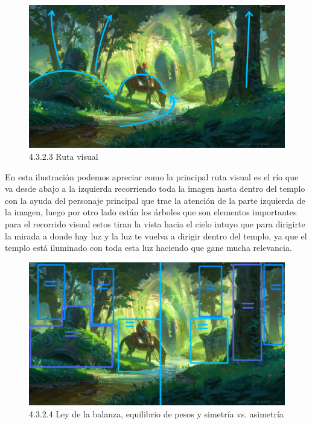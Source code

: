 \documentclass[12pt]{article}
\begin{document}
    \begin{figure}[H]
      \centering
      \includegraphics[width=\textwidth]{images/Saúl/Sección 3/EA_img3_2Composicion_3RutaVisual.png}
      \caption{\small 4.3.2.3 Ruta visual}
    \end{figure}

 En esta ilustración podemos apreciar como la principal ruta visual es el río que va desde abajo a la izquierda recorriendo toda la imagen hasta dentro del templo con la ayuda del personaje principal que trae la atención de la parte izquierda de la imagen, luego por otro lado están los árboles que son elementos importantes para el recorrido visual estos tiran la vista hacia el cielo intuyo que para dirigirte la mirada a donde hay luz y la luz te vuelva a dirigir dentro del templo, ya que el templo está iluminado con toda esta luz haciendo que gane mucha relevancia.

    \begin{figure}[H]
      \centering
      \includegraphics[width=\textwidth]{images/Saúl/Sección 3/EA_img3_2Composicion_4LeyBalanza-Simetria.png}
      \caption{\small 4.3.2.4 Ley de la balanza, equilibrio de pesos y simetría vs. asimetría}
    \end{figure}
\end{document}
